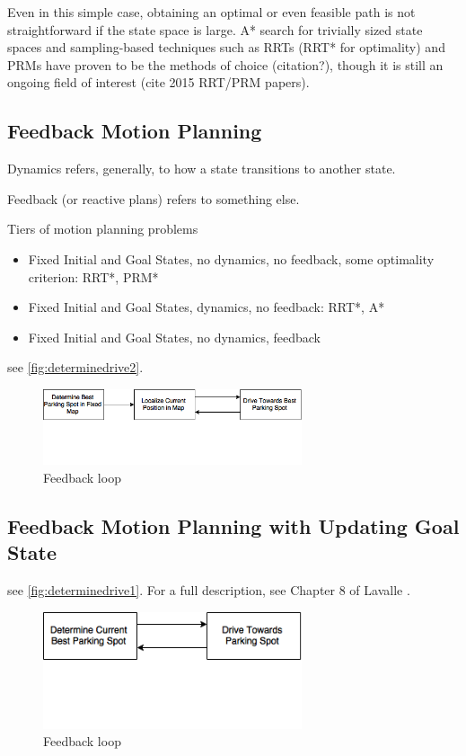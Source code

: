 Even in this simple case, obtaining an optimal or even feasible path is not
straightforward if the state space is large. A* search for trivially sized state
spaces and sampling-based techniques such as RRTs (RRT* for optimality) and PRMs
have proven to be the methods of choice (citation?), though it is still an
ongoing field of interest (cite 2015 RRT/PRM papers).

\subsection{Feedback Motion Planning}
Dynamics refers, generally, to how a state transitions to another state.

Feedback (or reactive plans) refers to something else.

Tiers of motion planning problems
\begin{itemize}
\item Fixed Initial and Goal States, no dynamics, no feedback, some optimality
criterion: RRT*, PRM*
\item Fixed Initial and Goal States, dynamics, no feedback: RRT*, A*
\item Fixed Initial and Goal States, no dynamics, feedback
\end{itemize}

see \autoref{fig:determinedrive2}.
\begin{figure}
\centering
\includegraphics[width=3in]{figures/determinedrive2.png}
\caption{Feedback loop}
\label{fig:determinedrive2}
\end{figure}


\subsection{Feedback Motion Planning with Updating Goal State}
see \autoref{fig:determinedrive1}.
For a full description, see Chapter 8 of Lavalle \cite{lavalle2006planning}.

\begin{figure}
\centering
\includegraphics[width=3in]{figures/determinedrive1.png}
\caption{Feedback loop}
\label{fig:determinedrive1}
\end{figure}

